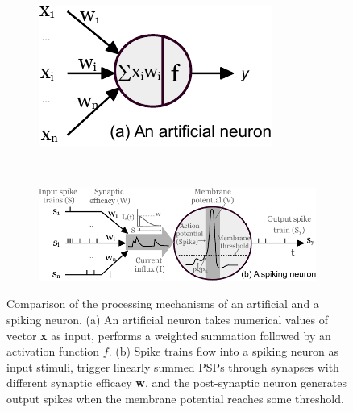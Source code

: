 \documentclass{article}
\begin{document}
\begin{figure}[tb!]
	\centering
	\begin{subfigure}[t]{0.28\textwidth}
		\includegraphics[width=\textwidth]{pics_iconip/neuron_ann.pdf}
	\end{subfigure}~
	\begin{subfigure}[t]{0.65\textwidth}
		\includegraphics[width=\textwidth]{pics_iconip/neuron_snn.pdf}
	\end{subfigure}
	\caption{Comparison of the processing mechanisms of an artificial and a spiking neuron. (a) An artificial neuron takes numerical values of vector \textbf{x} as input, performs a weighted summation followed by an activation function $f$. (b) Spike trains flow into a spiking neuron as input stimuli, trigger linearly summed PSPs through synapses with different synaptic efficacy \textbf{w}, and the post-synaptic neuron generates output spikes when the membrane potential reaches some threshold.}
	\label{Fig:compare_as}
\end{figure}
\end{document}
